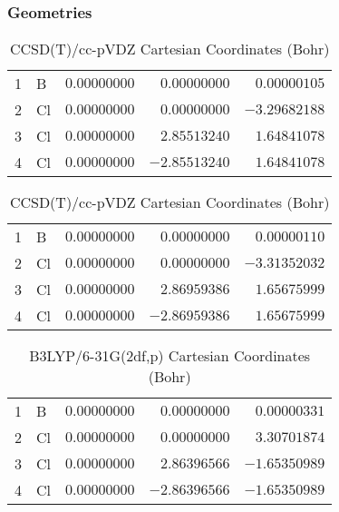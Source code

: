 \documentclass[10pt,oneside]{article}
\begin{document}
\clearpage

\subsection{}

\begin{table}[h!]
\subsubsection*{Geometries}
\begin{multicols}{2}
\centering
\caption{CCSD(T)/cc-pVTZ Cartesian Coordinates (Bohr)}
\begin{tabular}{llrrr}
\toprule
1  & B  & $ 0.00000000$ & $ 0.00000000$ & $ 0.00000105$ \\
2  & Cl & $ 0.00000000$ & $ 0.00000000$ & $-3.29682188$ \\
3  & Cl & $ 0.00000000$ & $ 2.85513240$ & $ 1.64841078$ \\
4  & Cl & $ 0.00000000$ & $-2.85513240$ & $ 1.64841078$ \\
\bottomrule
\end{tabular}
\caption{CCSD(T)/cc-pVDZ Cartesian Coordinates (Bohr)}
\begin{tabular}{llrrr}
\toprule
1  & B  & $ 0.00000000$ & $ 0.00000000$ & $ 0.00000110$ \\
2  & Cl & $ 0.00000000$ & $ 0.00000000$ & $-3.31352032$ \\
3  & Cl & $ 0.00000000$ & $ 2.86959386$ & $ 1.65675999$ \\
4  & Cl & $ 0.00000000$ & $-2.86959386$ & $ 1.65675999$ \\
\bottomrule
\end{tabular}
\end{multicols}
\end{table}

\begin{table}[h]
\centering
\caption{B3LYP/6-31G(2df,p) Cartesian Coordinates (Bohr)}
\begin{tabular}{llrrr}
\toprule
1  & B  & $ 0.00000000$ & $ 0.00000000$ & $ 0.00000331$ \\
2  & Cl & $ 0.00000000$ & $ 0.00000000$ & $ 3.30701874$ \\
3  & Cl & $ 0.00000000$ & $ 2.86396566$ & $-1.65350989$ \\
4  & Cl & $ 0.00000000$ & $-2.86396566$ & $-1.65350989$ \\
\bottomrule
\end{tabular}
\end{table}
\end{document}

